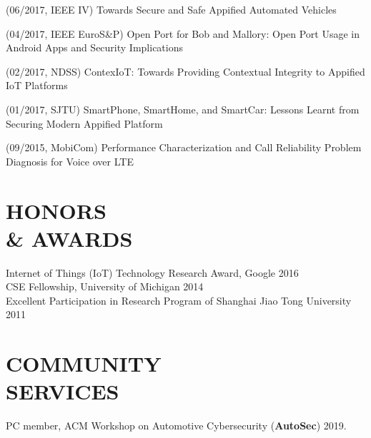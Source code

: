 \documentclass[margin]{res}
\begin{document}
\begin{resume}
(06/2017, IEEE IV) Towards Secure and Safe Appified Automated Vehicles

(04/2017, IEEE EuroS\&P) Open Port for Bob and Mallory: Open Port Usage in Android Apps and Security Implications

(02/2017, NDSS) ContexIoT: Towards Providing Contextual Integrity to Appified IoT Platforms

(01/2017, SJTU) SmartPhone, SmartHome, and SmartCar: Lessons Learnt from Securing Modern Appified Platform

(09/2015, MobiCom) Performance Characterization and Call Reliability Problem Diagnosis for Voice over LTE

\section{HONORS\\ \& AWARDS}
Internet of Things (IoT) Technology Research Award, Google \hfill 2016\\
CSE Fellowship, University of Michigan \hfill 2014 \\
Excellent Participation in Research Program of Shanghai Jiao Tong University \hfill 2011 \\

\section{COMMUNITY\\ SERVICES}
PC member, ACM Workshop on Automotive Cybersecurity (\textbf{AutoSec}) 2019.
\end{resume}
\end{document}
